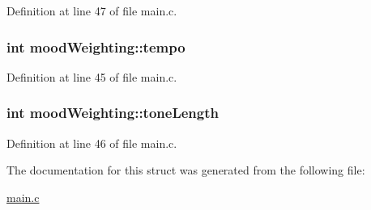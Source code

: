 Definition at line 47 of file main.\+c.

\hypertarget{structmood_weighting_a9b2180e8a4aab163ae48d0a66269a840}{
\subsubsection[{tempo}]{\setlength{\rightskip}{0pt plus 5cm}int mood\+Weighting\+::tempo}}\label{structmood_weighting_a9b2180e8a4aab163ae48d0a66269a840}


Definition at line 45 of file main.\+c.

\hypertarget{structmood_weighting_ab9e917ae02761f06d11c59645a45536d}{
\subsubsection[{tone\+Length}]{\setlength{\rightskip}{0pt plus 5cm}int mood\+Weighting\+::tone\+Length}}\label{structmood_weighting_ab9e917ae02761f06d11c59645a45536d}


Definition at line 46 of file main.\+c.



The documentation for this struct was generated from the following file\+:\begin{DoxyCompactItemize}
\item 
\hyperlink{main_8c}{main.\+c}\end{DoxyCompactItemize}
